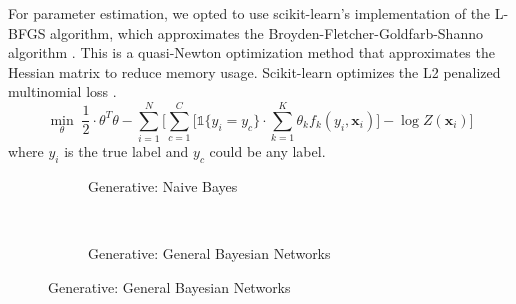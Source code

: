 \documentclass{article}
\begin{document}
For parameter estimation, we opted to use scikit-learn's implementation
of the L-BFGS algorithm, which approximates the Broyden-Fletcher-Goldfarb-Shanno
algorithm \cite{scikit-learn}. This is a quasi-Newton optimization method that approximates the
Hessian matrix to reduce memory usage. Scikit-learn optimizes the L2 penalized
multinomial loss \cite{scikit-learn} \cite{murphy}.
\begin{equation}
  \min_{\theta} \; \frac{1}{2} \cdot \theta^T \theta - \sum_{i=1}^N \Bigg[ \sum_{c=1}^C \Bigg[ \mathds{1} \{ y_i = y_c \} \cdot \sum_{k=1}^K \theta_k f_k\left( y_i, \mathbf{x}_i \right) \Bigg] - \log Z(\mathbf{x}_i)  \Bigg]
\end{equation}
where $y_i$ is the true label and $y_c$ could be any label.

\begin{figure}
    \centering
    \begin{subfigure}[t]{0.45\textwidth}
        \centering
        \caption*{Generative: Naive Bayes}
    \end{subfigure}%
    ~
    \begin{subfigure}[t]{0.45\textwidth}
        \centering
        \caption*{Generative: General Bayesian Networks}
    \end{subfigure}


\end{figure}
\end{document}
